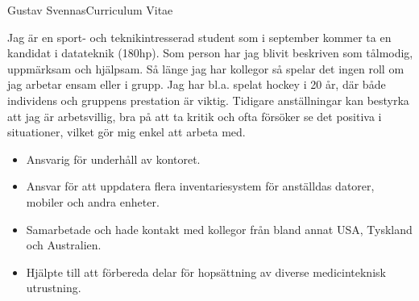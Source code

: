 \documentclass{article}
\begin{document}


\begin{cv}{Gustav Svennas}{Curriculum Vitae}


Jag är en sport- och teknikintresserad student som i september kommer ta en kandidat i datateknik (180hp). Som person har jag blivit beskriven som tålmodig, uppmärksam och hjälpsam. Så länge jag har kollegor så spelar det ingen roll om jag arbetar ensam eller i grupp. Jag har bl.a. spelat hockey i 20 år, där både individens och gruppens prestation är viktig. Tidigare anställningar kan bestyrka att jag är arbetsvillig, bra på att ta kritik och ofta försöker se det positiva i situationer, vilket gör mig enkel att arbeta med.



\begin{cvevent}[2022-07][2022-08]
    \begin{itemize}
        \item Ansvarig för underhåll av kontoret.
    \end{itemize}
\end{cvevent}


\begin{cvevent}[2021-03][2021-10]
    \begin{itemize}
        \item Ansvar för att uppdatera flera inventariesystem för anställdas datorer, mobiler och andra enheter.
        \item Samarbetade och hade kontakt med kollegor från bland annat USA, Tyskland och Australien.
    \end{itemize}
\end{cvevent}


\begin{cvevent}[2015-06][2015-07]
    \begin{itemize}
        \item Hjälpte till att förbereda delar för hopsättning av diverse medicinteknisk utrustning.
    \end{itemize}
\end{cvevent}


\end{cv}
\end{document}
